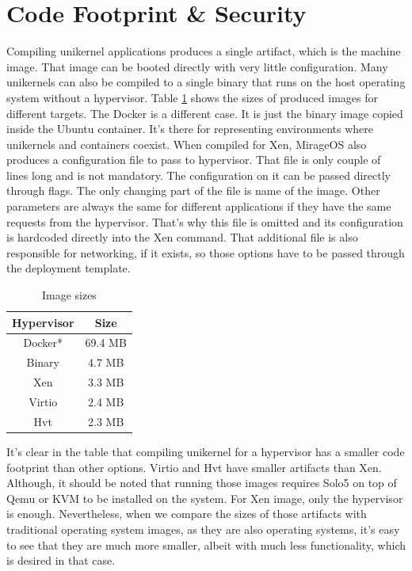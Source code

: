 \section{Code Footprint \& Security}
Compiling unikernel applications produces a single artifact, which is the machine image. That image can be booted directly with very little configuration. Many unikernels can also be compiled to a single binary that runs on the host operating system without a hypervisor. Table \ref{tab:sizes} shows the sizes of produced images for different targets. The Docker is a different case. It is just the binary image copied inside the Ubuntu container. It's there for representing environments where unikernels and containers coexist. When compiled for Xen, MirageOS also produces a configuration file to pass to hypervisor. That file is only couple of lines long and is not mandatory. The configuration on it can be passed directly through flags. The only changing part of the file is name of the image. Other parameters are always the same for different applications if they have the same requests from the hypervisor. That's why this file is omitted and its configuration is hardcoded directly into the Xen command. That additional file is also responsible for networking, if it exists, so those options have to be passed through the deployment template.


\begin{table}[htpb]
  
  \centering
  \begin{tabular}{ |c|c| }
    \toprule
      Hypervisor & Size \\
    \midrule
    Docker* & 69.4 MB \\
     
      \hline
      Binary & 4.7 MB \\
    \hline
    Xen &  3.3 MB\\
    \hline
    Virtio & 2.4 MB \\
    \hline
      Hvt & 2.3 MB\\
    \bottomrule
  \end{tabular}
  \caption[Image Sizes]{Image sizes}\label{tab:sizes}
\end{table}


It's clear in the table that compiling unikernel for a hypervisor has a smaller code footprint than other options. Virtio and Hvt have smaller artifacts than Xen. Although, it should be noted that running those images requires Solo5 on top of Qemu or KVM to be installed on the system. For Xen image, only the hypervisor is enough. Nevertheless, when we compare the sizes of those artifacts with traditional operating system images, as they are also operating systems, it's easy to see that they are much more smaller, albeit with much less functionality, which is desired in that case.

